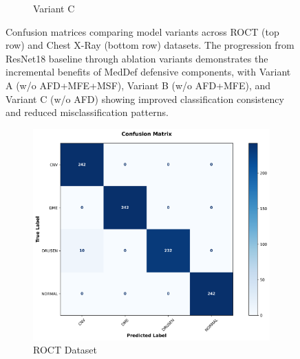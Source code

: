 \documentclass[preprint,12pt]{elsarticle}
\begin{document}
\begin{figure}[!t]
\begin{subfigure}[b]{0.24\columnwidth}
\caption{Variant C}
\label{fig:confusion_intermediate3_chest}
\end{subfigure}
\caption{Confusion matrices comparing model variants across ROCT (top row) and Chest X-Ray (bottom row) datasets. The progression from ResNet18 baseline through ablation variants demonstrates the incremental benefits of MedDef defensive components, with Variant A (w/o AFD+MFE+MSF), Variant B (w/o AFD+MFE), and Variant C (w/o AFD) showing improved classification consistency and reduced misclassification patterns.}
\label{fig:confusion_matrices_variants}
\end{figure}

\begin{figure}[!t]
\centering
\begin{subfigure}[b]{0.45\columnwidth}
\centering
\includegraphics[width=\columnwidth]{fig/cm/roct/roct_meddef1.png}
\caption{ROCT Dataset}
\label{fig:confusion_meddef_roct}
\end{subfigure}
\hfill
\begin{subfigure}[b]{0.45\columnwidth}
\centering

\end{subfigure}
\end{figure}
\end{document}
